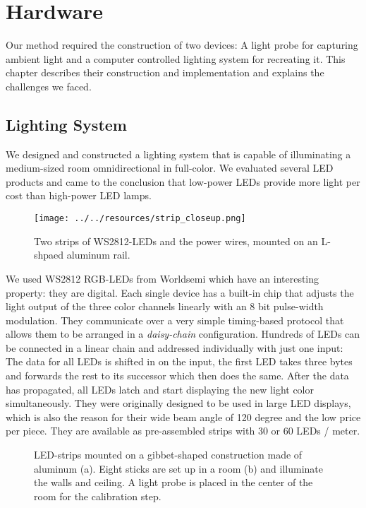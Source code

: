 
\chapter{Hardware}
\label{chap:hardware}

Our method required the construction of two devices: A light probe for capturing ambient light and a computer controlled lighting system for recreating it.
This chapter describes their construction and implementation and explains the challenges we faced.


\section{Lighting System}
\label{sec:lightsystem}

We designed and constructed a lighting system that is capable of illuminating a medium-sized room omnidirectional in full-color.
We evaluated several LED products and came to the conclusion that low-power LEDs provide more light per cost than high-power LED lamps.

 \begin{figure}[H]
  \centering
  \texttt{[image: ../../resources/strip\_closeup.png]}
  \caption[LED-strips with WS2812-LEDs]{Two strips of WS2812-LEDs and the power wires, mounted on an L-shpaed aluminum rail.}
  \label{fig:stripcloseup}
  \end{figure}

We used WS2812 RGB-LEDs from Worldsemi \cite{WS2812} which have an interesting property: they are digital.
Each single device has a built-in chip that adjusts the light output of the three color channels linearly with an 8 bit pulse-width modulation.
They communicate over a very simple timing-based protocol that allows them to be arranged in a \emph{daisy-chain} configuration.
Hundreds of LEDs can be connected in a linear chain and addressed individually with just one input:
The data for all LEDs is shifted in on the input, the first LED takes three bytes and forwards the rest to its successor which then does the same.
After the data has propagated, all LEDs latch and start displaying the new light color simultaneously.
They were originally designed to be used in large LED displays, which is also the reason for their wide beam angle of 120 degree and the low price per piece.
They are available as pre-assembled strips with 30 or 60 LEDs / meter.

 \begin{figure}
  \hfill
  \caption[Our Lighting System]{LED-strips mounted on a gibbet-shaped construction made of aluminum (a). Eight sticks are set up in a room (b) and illuminate the walls and ceiling. A light probe is placed in the center of the room for the calibration step. }
  \label{fig:plabsetup}
 \end{figure}
  
